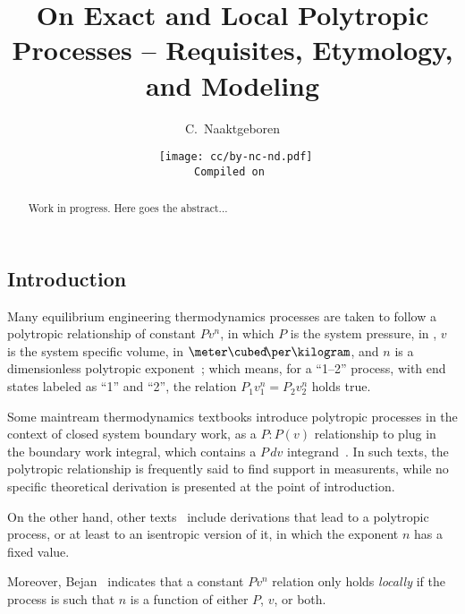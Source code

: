 \documentclass[10pt,a4paper]{article}
\title{On Exact and Local Polytropic Processes -- Requisites, Etymology, and Modeling}
\author[1]{C.~Naaktgeboren}
\affil[1]{%
    Universidade Tecnológica Federal do Paraná -- UTFPR, Câmpus Guarapuava.\par
    Grupo de Pesquisa em Ciências Térmicas.
}
\date{{\scriptsize\tt%
    \texttt{[image: cc/by-nc-nd.pdf]}\\
    Compiled on 
}}
\begin{document}

\maketitle

\begin{abstract}
    Work in progress.
    Here goes the abstract...
\end{abstract}

\begin{multicols}{2}

\section{Introduction}

    Many equilibrium engineering thermodynamics processes  are  taken  to  follow  a  polytropic
    relationship of constant $Pv^n$, in which $P$ is the system pressure, in  \kilo\pascal,  $v$
    is the system specific volume, in $\meter\cubed\!\per\kilogram$, and $n$ is a  dimensionless
    polytropic exponent~\cite{2013-CengelYA+BolesMA-AMGH}; which means, for a ``1--2''  process,
    with end states labeled as ``1'' and ``2'', the relation $P_1v_1^n = P_2v_2^n$ holds true.

    Some maintream thermodynamics textbooks introduce polytropic processes  in  the  context  of
    closed system boundary work, as a  $P:P(v)$  relationship  to  plug  in  the  boundary  work
    integral,   which    contains    a    $P\,dv$    integrand~\cite{2013-CengelYA+BolesMA-AMGH,
    2002-MoranMJ+ShapiroHN-LTC, 1985-WylenG-Wiley}. In such texts, the  polytropic  relationship
    is frequently said to find support in measurents, while no specific  theoretical  derivation
    is presented at the point of introduction.

    On  the  other  hand,  other  texts~\cite{1986-JonesJB+HawkinsGA-Wiley,   2006-BejanA-Wiley,
    2015-KroosKA+PotterMC-Cengage} include derivations that lead to a polytropic process, or  at
    least to an isentropic version of it, in which the exponent $n$ has a fixed value.

    Moreover, Bejan~\cite[p.~175]{2006-BejanA-Wiley} indicates that a constant  $Pv^n$  relation
    only holds \emph{locally} if the process is such that $n$ is a function of either $P$,  $v$,
    or both.


\end{multicols}
\end{document}
